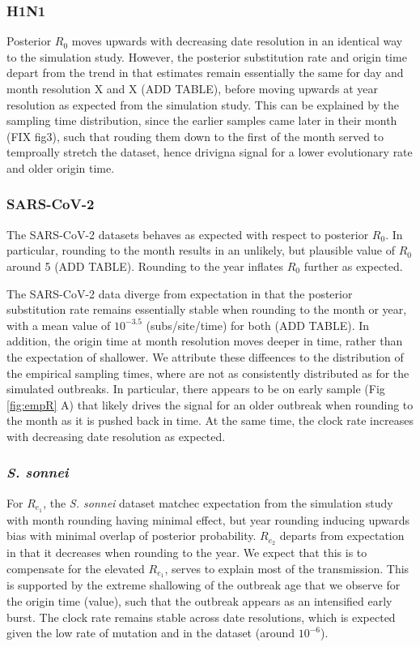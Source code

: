 \documentclass{article}
\begin{document}
\begin{spacing}{1.5}
\subsubsection*{H1N1}
Posterior $R_0$ moves upwards with decreasing date resolution in an identical way to the simulation study. However, the posterior substitution rate and origin time depart from the trend in that estimates remain essentially the same for day and month resolution X and X (ADD TABLE),  before moving upwards at year resolution as expected from the simulation study. This can be explained by the sampling time distribution, since the earlier samples came later in their month (FIX fig3), such that rouding them down to the first of the month served to temproally stretch the dataset, hence drivigna signal for a lower evolutionary rate and older origin time.
\subsubsection*{SARS-CoV-2}
The SARS-CoV-2 datasets behaves as expected with respect to posterior $R_0$. In particular, rounding to the month results in an unlikely, but plausible value of $R_0$ around 5 (ADD TABLE). Rounding to the year inflates $R_0$ further as expected.

The SARS-CoV-2 data diverge from expectation in that the posterior substitution rate remains essentially stable when rounding to the month or year, with a mean value of $10^{-3.5}$ (subs/site/time) for both (ADD TABLE). In addition, the origin time at month resolution moves deeper in time, rather than the expectation of shallower. We attribute these diffeences to the distribution of the empirical sampling times, where are not as consistently distributed as for the simulated outbreaks. In particular, there appears to be on early sample (Fig \ref{fig:empR} A) that likely drives the signal for an older outbreak when rounding to the month as it is pushed back in time. At the same time, the clock rate increases with decreasing date resolution as expected.
\subsubsection*{\textit{S. sonnei}}
For $R_{e_1}$, the \textit{S. sonnei} dataset matchec expectation from the simulation study with month rounding having minimal effect, but year rounding inducing upwards bias with minimal overlap of posterior probability. $R_{e_2}$ departs from expectation in that it decreases when rounding to the year. We expect that this is to compensate for the elevated $R_{e_1}$, serves to explain most of the transmission. This is supported by the extreme shallowing of the outbreak age that we observe for the origin time (value), such that the outbreak appears as an intensified early burst. The clock rate remains stable across date resolutions, which is expected given the low rate of mutation and in the dataset (around $10^{-6}$).

\end{spacing}
\end{document}
